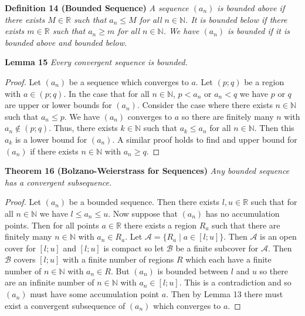 \documentclass{article}
\begin{document}
\begin{flushleft}
\textbf{Definition 14 (Bounded Sequence)}
\textsl{A sequence $(a_n)$ is bounded above if there exists $M \in \mathbb{R}$ such that $a_n \leq M$ for all $n \in \mathbb{N}$. It is bounded below if there exists $m \in \mathbb{R}$ such that $a_n \geq m$ for all $n \in \mathbb{N}$. We have $(a_n)$ is bounded if it is bounded above and bounded below.}\newline

\textbf{Lemma 15}
\textsl{Every convergent sequence is bounded.}
\begin{proof}
Let $(a_n)$ be a sequence which converges to $a$. Let $(p;q)$ be a region with $a \in (p;q)$. In the case that for all $n \in \mathbb{N}$, $p < a_n$ or $a_n < q$ we have $p$ or $q$ are upper or lower bounds for $(a_n)$. Consider the case where there exists $n \in \mathbb{N}$ such that $a_n \leq p$. We have $(a_n)$ converges to $a$ so there are finitely many $n$ with $a_n \notin (p;q)$. Thus, there exists $k \in \mathbb{N}$ such that $a_k \leq a_n$ for all $n \in \mathbb{N}$. Then this $a_k$ is a lower bound for $(a_n)$. A similar proof holds to find and upper bound for $(a_n)$ if there exists $n \in \mathbb{N}$ with $a_n \geq q$.
\end{proof}

\textbf{Theorem 16 (Bolzano-Weierstrass for Sequences)}
\textsl{Any bounded sequence has a convergent subsequence.}
\begin{proof}
Let $(a_n)$ be a bounded sequence. Then there exists $l,u \in \mathbb{R}$ such that for all $n \in \mathbb{N}$ we have $l \leq a_n \leq u$. Now suppose that $(a_n)$ has no accumulation points. Then for all points $a \in \mathbb{R}$ there exists a region $R_a$ such that there are finitely many $n \in \mathbb{N}$ with $a_n \in R_a$. Let $\mathcal{A} = \{R_a \mid a \in [l;u]\}$. Then $\mathcal{A}$ is an open cover for $[l;u]$ and $[l;u]$ is compact so let $\mathcal{B}$ be a finite subcover for $\mathcal{A}$. Then $\mathcal{B}$ covers $[l;u]$ with a finite number of regions $R$ which each have a finite number of $n \in \mathbb{N}$ with $a_n \in R$. But $(a_n)$ is bounded between $l$ and $u$ so there are an infinite number of $n \in \mathbb{N}$ with $a_n \in [l;u]$. This is a contradiction and so $(a_n)$ must have some accumulation point $a$. Then by Lemma 13 there must exist a convergent subsequence of $(a_n)$ which converges to $a$.
\end{proof}


\end{flushleft}
\end{document}
